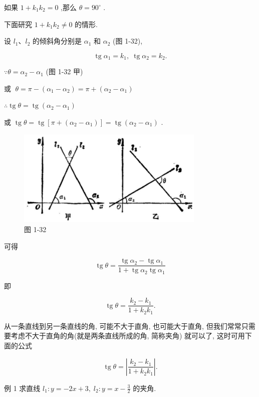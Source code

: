 \documentclass[lang=cn,newtx,10pt,scheme=chinese]{elegantbook}
\begin{document}
如果 \(1 + {k}_{1}{k}_{2} = 0\) ,那么 \(\theta = {90}^{ \circ }\) .

下面研究 \(1 + {k}_{1}{k}_{2} \neq 0\) 的情形.

设 \({l}_{1}\text{、}{l}_{2}\) 的倾斜角分别是 \({\alpha }_{1}\) 和 \({\alpha }_{2}\) (图 1-32),

\[
  \operatorname{tg}{\alpha }_{1} = {k}_{1},\;\operatorname{tg}{\alpha }_{2} = {k}_{2}.
\]

\(\because \theta = {\alpha }_{2} - {\alpha }_{1}\) (图 1-32 甲)

或 \(\;\theta = \pi - \left( {{\alpha }_{1} - {\alpha }_{2}}\right) = \pi + \left( {{\alpha }_{2} - {\alpha }_{1}}\right)\)

\(\therefore \operatorname{tg}\theta = \operatorname{tg}\left( {{\alpha }_{2} - {\alpha }_{1}}\right)\)

或 \(\operatorname{tg}\theta = \operatorname{tg}\left\lbrack {\pi + \left( {{\alpha }_{2} - {\alpha }_{1}}\right) }\right\rbrack = \operatorname{tg}\left( {{\alpha }_{2} - {\alpha }_{1}}\right)\) .

\begin{figure}[h]
  \centering
  \includegraphics[max width=0.8\textwidth]{images/01912cc2-ffb6-728e-9ae7-b113ff05c64b_47_848929.jpg}
  \caption{图 1-32}
\end{figure}



可得

\[
  \operatorname{tg}\theta = \frac{\operatorname{tg}{\alpha }_{2} - \operatorname{tg}{\alpha }_{1}}{1 + \operatorname{tg}{\alpha }_{2}\operatorname{tg}{\alpha }_{1}}
\]

即

\[
  \operatorname{tg}\theta = \frac{{k}_{2} - {k}_{1}}{1 + {k}_{2}{k}_{1}}.
\]
\begin{corollary}
从一条直线到另一条直线的角, 可能不大于直角, 也可能大于直角, 但我们常常只需要考虑不大于直角的角(就是两条直线所成的角, 简称夹角) 就可以了, 这时可用下面的公式

\[
  \operatorname{tg}\theta = \left| \frac{{k}_{2} - {k}_{1}}{1 + {k}_{2}{k}_{1}}\right| .
\]
\end{corollary}
例 1 求直线 \({l}_{1} : y = - {2x} + 3,\;{l}_{2} : y = x - \frac{3}{2}\) 的夹角.
\end{document}
